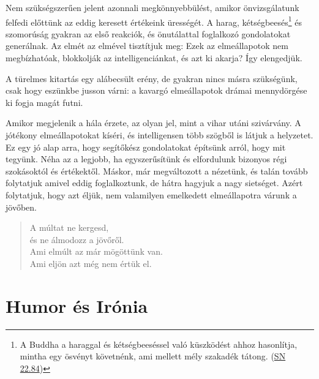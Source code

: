 Nem szükségszerűen jelent azonnali megkönnyebbülést, amikor
önvizsgálatunk felfedi előttünk az eddig keresett értékeink ürességét. A
harag, kétségbeesés\footnote{A Buddha a haraggal és kétségbeeséssel való
  küszködést ahhoz hasonlítja, mintha egy ösvényt követnénk, ami mellett
  mély szakadék tátong.
  (\href{https://www.accesstoinsight.org/tipitaka/sn/sn22/sn22.084.than.html}{SN
  22.84})} és szomorúság gyakran az első reakciók, és önutálattal
foglalkozó gondolatokat generálnak. Az elmét az elmével tisztítjuk meg:
Ezek az elmeállapotok nem megbízhatóak, blokkolják az intelligenciánkat,
és azt ki akarja? Így elengedjük.

\enlargethispage*{2\baselineskip}


A türelmes kitartás egy alábecsült erény, de gyakran nincs másra
szükségünk, csak hogy eszünkbe jusson várni: a kavargó elmeállapotok
drámai mennydörgése ki fogja magát futni.

Amikor megjelenik a hála érzete, az olyan jel, mint a vihar utáni
szivárvány. A jótékony elmeállapotokat kíséri, és intelligensen több
szögből is látjuk a helyzetet. Ez egy jó alap arra, hogy segítőkész
gondolatokat építsünk arról, hogy mit tegyünk. Néha az a legjobb, ha
egyszerűsítünk és elfordulunk bizonyos régi szokásoktól és értékektől.
Máskor, már megváltozott a nézetünk, és talán tovább folytatjuk amivel
eddig foglalkoztunk, de hátra hagyjuk a nagy sietséget. Azért
folytatjuk, hogy azt éljük, nem valamilyen emelkedett elmeállapotra
várunk a jövőben.

\begin{quote}
A múltat ne kergesd,\\
és ne álmodozz a jövőről.\\
Ami elmúlt az már mögöttünk van.\\
Ami eljön azt még nem értük el.

\bigskip

\end{quote}

\section{Humor és Irónia}


